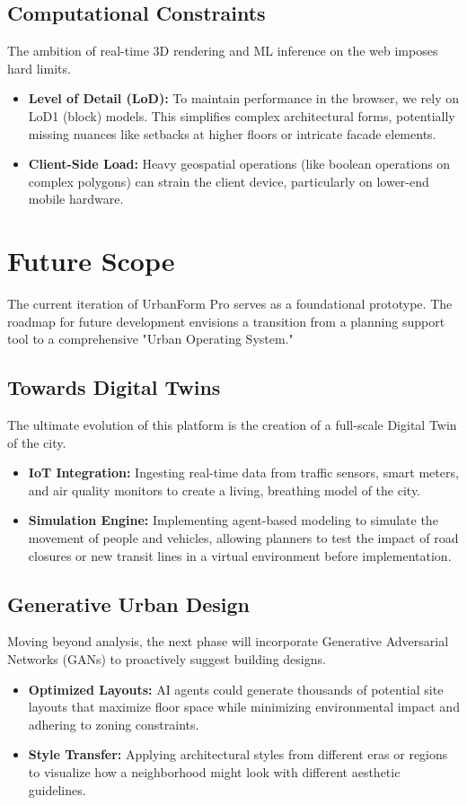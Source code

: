 \documentclass[12pt,a4paper]{report}
\begin{document}
\subsection{Computational Constraints}
The ambition of real-time 3D rendering and ML inference on the web imposes hard limits.
\begin{itemize}
    \item \textbf{Level of Detail (LoD):} To maintain performance in the browser, we rely on LoD1 (block) models. This simplifies complex architectural forms, potentially missing nuances like setbacks at higher floors or intricate facade elements.
    \item \textbf{Client-Side Load:} Heavy geospatial operations (like boolean operations on complex polygons) can strain the client device, particularly on lower-end mobile hardware.
\end{itemize}

\section{Future Scope}
The current iteration of UrbanForm Pro serves as a foundational prototype. The roadmap for future development envisions a transition from a planning support tool to a comprehensive "Urban Operating System."

\subsection{Towards Digital Twins}
The ultimate evolution of this platform is the creation of a full-scale Digital Twin of the city.
\begin{itemize}
    \item \textbf{IoT Integration:} Ingesting real-time data from traffic sensors, smart meters, and air quality monitors to create a living, breathing model of the city.
    \item \textbf{Simulation Engine:} Implementing agent-based modeling to simulate the movement of people and vehicles, allowing planners to test the impact of road closures or new transit lines in a virtual environment before implementation.
\end{itemize}

\subsection{Generative Urban Design}
Moving beyond analysis, the next phase will incorporate Generative Adversarial Networks (GANs) to proactively suggest building designs.
\begin{itemize}
    \item \textbf{Optimized Layouts:} AI agents could generate thousands of potential site layouts that maximize floor space while minimizing environmental impact and adhering to zoning constraints.
    \item \textbf{Style Transfer:} Applying architectural styles from different eras or regions to visualize how a neighborhood might look with different aesthetic guidelines.
\end{itemize}
\end{document}
